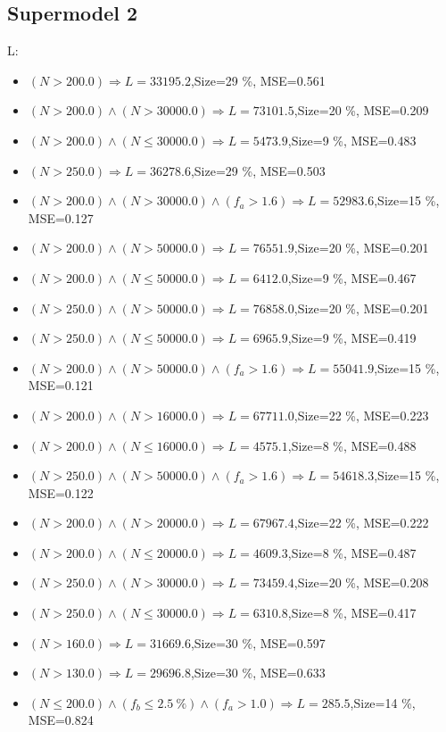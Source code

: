 \documentclass[numbered]{CSL}
\begin{document}
\subsection{Supermodel 2}
L:
\begin{itemize}
\item $(N > 200.0) \Rightarrow L = 33195.2$,\hfill Size=29 \%, MSE=0.561
\item $(N > 200.0) \land (N > 30000.0) \Rightarrow L = 73101.5$,\hfill Size=20 \%, MSE=0.209
\item $(N > 200.0) \land (N \leq 30000.0) \Rightarrow L = 5473.9$,\hfill Size=9 \%, MSE=0.483
\item $(N > 250.0) \Rightarrow L = 36278.6$,\hfill Size=29 \%, MSE=0.503
\item $(N > 200.0) \land (N > 30000.0) \land (f_a > 1.6) \Rightarrow L = 52983.6$,\hfill Size=15 \%, MSE=0.127
\item $(N > 200.0) \land (N > 50000.0) \Rightarrow L = 76551.9$,\hfill Size=20 \%, MSE=0.201
\item $(N > 200.0) \land (N \leq 50000.0) \Rightarrow L = 6412.0$,\hfill Size=9 \%, MSE=0.467
\item $(N > 250.0) \land (N > 50000.0) \Rightarrow L = 76858.0$,\hfill Size=20 \%, MSE=0.201
\item $(N > 250.0) \land (N \leq 50000.0) \Rightarrow L = 6965.9$,\hfill Size=9 \%, MSE=0.419
\item $(N > 200.0) \land (N > 50000.0) \land (f_a > 1.6) \Rightarrow L = 55041.9$,\hfill Size=15 \%, MSE=0.121
\item $(N > 200.0) \land (N > 16000.0) \Rightarrow L = 67711.0$,\hfill Size=22 \%, MSE=0.223
\item $(N > 200.0) \land (N \leq 16000.0) \Rightarrow L = 4575.1$,\hfill Size=8 \%, MSE=0.488
\item $(N > 250.0) \land (N > 50000.0) \land (f_a > 1.6) \Rightarrow L = 54618.3$,\hfill Size=15 \%, MSE=0.122
\item $(N > 200.0) \land (N > 20000.0) \Rightarrow L = 67967.4$,\hfill Size=22 \%, MSE=0.222
\item $(N > 200.0) \land (N \leq 20000.0) \Rightarrow L = 4609.3$,\hfill Size=8 \%, MSE=0.487
\item $(N > 250.0) \land (N > 30000.0) \Rightarrow L = 73459.4$,\hfill Size=20 \%, MSE=0.208
\item $(N > 250.0) \land (N \leq 30000.0) \Rightarrow L = 6310.8$,\hfill Size=8 \%, MSE=0.417
\item $(N > 160.0) \Rightarrow L = 31669.6$,\hfill Size=30 \%, MSE=0.597
\item $(N > 130.0) \Rightarrow L = 29696.8$,\hfill Size=30 \%, MSE=0.633
\item $(N \leq 200.0) \land (f_b \leq 2.5~\%) \land (f_a > 1.0) \Rightarrow L = 285.5$,\hfill Size=14 \%, MSE=0.824
\end{itemize}
\end{document}
